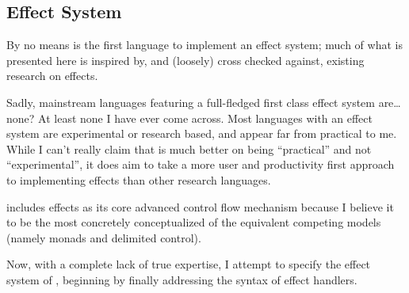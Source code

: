 \subsection{Effect System}
\label{sec:effects}

By no means is \Trilogy{} the first language to implement an effect system;
much of what is presented here is inspired by, and (loosely) cross checked against,
existing research on effects\cite{eff}.

Sadly, mainstream languages featuring a full-fledged first class effect system
are\dots{} none? At least none I have ever come across. Most languages with an
effect system are experimental or research based, and appear far from practical
to me. While I can't really claim that \Trilogy{} is much better on being ``practical''
and not ``experimental'', it does aim to take a more user and productivity first
approach to implementing effects than other research languages.

\Trilogy{} includes effects as its core advanced control flow mechanism because
I believe it to be the most concretely conceptualized of the equivalent competing
models (namely monads and delimited control\cite{effmondel}).

Now, with a complete lack of true expertise, I attempt to specify the effect
system of \Trilogy{}, beginning by finally addressing the syntax of effect
handlers.

\begin{bnf*}
     \\
     \\
     \\
     \\
     \\
     \\
     \\
\end{bnf*}

